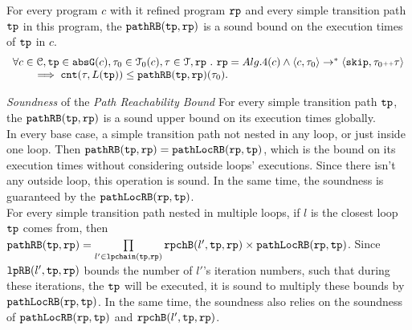 \begin{lem}
    For every program $c$ with it refined program $\mathtt{rp}$ and 
    every simple transition path $\mathtt{tp}$ in this program,
     the $\mathtt{pathRB}(\mathtt{tp}, \mathtt{rp})$
  is a sound bound on the execution times of $\mathtt{tp}$ in $c$.
    \[
      \begin{array}{l}
      \forall c \in \mathcal{C}, \mathtt{tp} \in \mathtt{abs}{\mathtt{G}}(c), \mathtt{\tau}_0 \in \mathcal{T}_0(c), \mathtt{\tau} \in \mathcal{T}, \mathtt{rp} ~.~ 
      \mathtt{rp} = Alg.4(c)
      \land
      \langle c, \mathtt{\tau}_0 \rangle \to^* 
      \langle {\ensuremath{\mathtt{skip}}, \ensuremath{\mathtt{\tau}}_0 {\scriptscriptstyle ++}\ensuremath{\mathtt{\tau}}} \rangle
      \\ \qquad
      \implies
      \mathtt{cnt}(\mathtt{\tau}, L(\mathtt{tp})) \leq \mathtt{pathRB}(\mathtt{tp}, \mathtt{rp})(\mathtt{\tau}_0).
      \end{array}
      \]
  \end{lem}
  \emph{Soundness} of the \emph{Path Reachability Bound}  
For every simple transition path $\mathtt{tp}$, the $\mathtt{pathRB}(\mathtt{tp}, \mathtt{rp})$
is a sound upper bound on its execution times globally.
\\
In every base case, a simple transition path not nested in any loop, or just inside one loop.
Then $\mathtt{pathRB}(\mathtt{tp}, \mathtt{rp}) = \mathtt{pathLocRB}(\mathtt{rp}, \mathtt{tp})$, which is the bound on its execution times without considering
outside loops' executions. Since there isn't any outside loop, this operation is sound.
In the same time, the soundness is guaranteed by the $\mathtt{pathLocRB}(\mathtt{rp}, \mathtt{tp})$.
\\
For every simple transition path nested in multiple loops, if $l$ is the closest loop $\mathtt{tp}$ comes from, then
$\mathtt{pathRB}(\mathtt{tp}, \mathtt{rp}) =
\prod\limits_{l' \in \mathtt{lpchain}(\mathtt{tp}, \mathtt{rp})} \mathtt{rpchB}(l', \mathtt{tp}, \mathtt{rp}) \times \mathtt{pathLocRB}(\mathtt{rp}, \mathtt{tp})$.
Since $\mathtt{lpRB}(l', \mathtt{tp}, \mathtt{rp})$ bounds the number of $l'$'s iteration numbers,
such that during these iterations, the $\mathtt{tp}$ will be executed,
it is sound to multiply these bounds by $\mathtt{pathLocRB}(\mathtt{rp}, \mathtt{tp})$.
In the same time, the soundness also relies on the soundness of $\mathtt{pathLocRB}(\mathtt{rp}, \mathtt{tp})$ and $\mathtt{rpchB}(l', \mathtt{tp}, \mathtt{rp})$. 
%
